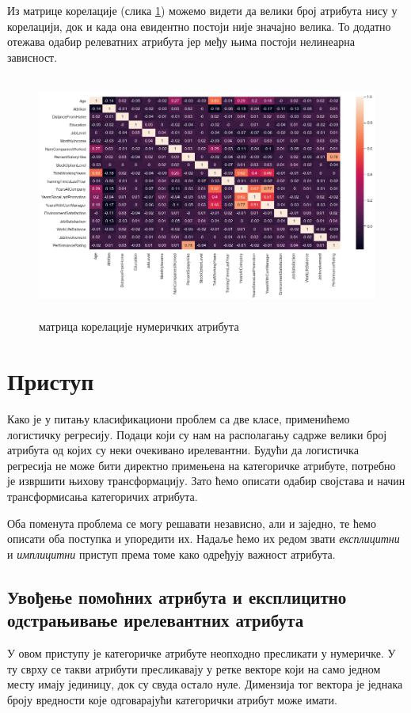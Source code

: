\documentclass[12pt, a4paper]{article}
\begin{document}
	Из матрице корелације (слика \ref{fig:corr}) можемо видети да велики број атрибута нису у корелацији, док и када она евидентно постоји није значајно велика. То додатно отежава одабир релеватних атрибута јер међу њима постоји нелинеарна зависност.
	
	\begin{figure}[H]
		\centering
		\includegraphics[height=8cm]{graphics/full_correlation.png}
		\caption{матрица корелације нумеричких атрибута}
		\label{fig:corr}
	\end{figure}

\section{Приступ}
	Како је у питању класификациони проблем са две класе, применићемо логистичку регресију. Подаци који су нам на располагању садрже велики број атрибута од којих су неки очекивано ирелевантни. Будући да логистичка регресија не може бити директно примењена на категоричке атрибуте, потребно је извршити њихову трансформацију. Зато ћемо описати одабир својстава и начин трансформисања категоричих атрибута.
	
	Оба поменута проблема се могу решавати независно, али и заједно, те ћемо описати оба поступка и упоредити их. Надаље ћемо их редом звати \textit{експлицитни} и \textit{имплицитни} приступ према томе како одређују важност атрибута.
	
	\subsection{Увођење помоћних атрибута и експлицитно одстрањивање ирелевантних атрибута}
		У овом приступу је категоричке атрибуте неопходно пресликати у нумеричке. У ту сврху се такви атрибути пресликавају у ретке векторе који на само једном месту имају јединицу, док су свуда остало нуле. Димензија тог вектора је једнака броју вредности које одговарајући категорички атрибут може имати.
	
\end{document}

